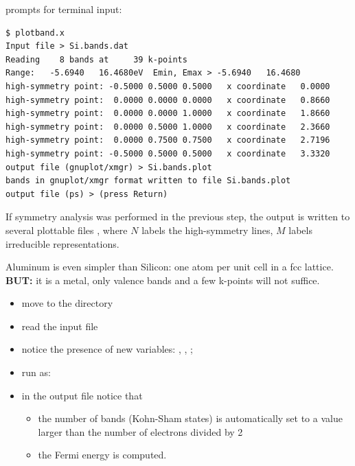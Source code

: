 \documentclass[landscape]{foils}
\begin{document}
 prompts for terminal input:
{\codecolor
\begin{verbatim}
$ plotband.x 
Input file > Si.bands.dat
Reading    8 bands at     39 k-points
Range:   -5.6940   16.4680eV  Emin, Emax > -5.6940   16.4680
high-symmetry point: -0.5000 0.5000 0.5000   x coordinate   0.0000
high-symmetry point:  0.0000 0.0000 0.0000   x coordinate   0.8660
high-symmetry point:  0.0000 0.0000 1.0000   x coordinate   1.8660
high-symmetry point:  0.0000 0.5000 1.0000   x coordinate   2.3660
high-symmetry point:  0.0000 0.7500 0.7500   x coordinate   2.7196
high-symmetry point: -0.5000 0.5000 0.5000   x coordinate   3.3320
output file (gnuplot/xmgr) > Si.bands.plot   
bands in gnuplot/xmgr format written to file Si.bands.plot
output file (ps) > (press Return)
\end{verbatim}
}
%
If symmetry analysis was performed in the previous step, the output is
written to several plottable files ,
where $N$ labels the high-symmetry lines,
$M$ labels irreducible representations.


%
Aluminum is even simpler than Silicon: one atom per unit cell
in a fcc lattice.\\
{\bf BUT:} it is a metal, only valence bands and a few k-points will
not suffice.
\begin{itemize}
\item move to the  directory
\item read the  input file 
\item notice the presence of new variables: ,
, ;
\item run  as:\\[0.5em]
\item in the output file notice that
  \begin{itemize}
  \item the number of bands (Kohn-Sham states)
    is automatically set to a value larger than the number of
    electrons divided by 2
  \item the Fermi energy is computed.
  \end{itemize}
\end{itemize}
\end{document}
